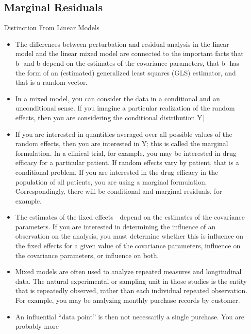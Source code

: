 \documentclass[Main.tex]{subfiles}
\begin{document}

\subsection*{Marginal Residuals}


Distinction From Linear Models
\begin{itemize}
	\item The differences between perturbation and residual analysis in the linear model and the linear mixed model
	are connected to the important facts that b and b
	depend on the estimates of the covariance parameters,
	that b has the form of an (estimated) generalized least squares (GLS) estimator, and that 
	is a random
	vector.
	\item In a mixed model, you can consider the data in a conditional and an unconditional sense. If you imagine
	a particular realization of the random effects, then you are considering the conditional distribution
	Y|
	\item If you are interested in quantities averaged over all possible values of the random effects, then
	you are interested in Y; this is called the marginal formulation. In a clinical trial, for example, you
	may be interested in drug efficacy for a particular patient. If random effects vary by patient, that is a
	conditional problem. If you are interested in the drug efficacy in the population of all patients, you are
	using a marginal formulation. Correspondingly, there will be conditional and marginal residuals, for
	example.
	\item The estimates of the fixed effects  depend on the estimates of the covariance parameters. If you are
	interested in determining the influence of an observation on the analysis, you must determine whether
	this is influence on the fixed effects for a given value of the covariance parameters, influence on the
	covariance parameters, or influence on both.
	\item Mixed models are often used to analyze repeated measures and longitudinal data. The natural experimental
	or sampling unit in those studies is the entity that is repeatedly observed, rather than each
	individual repeated observation. For example, you may be analyzing monthly purchase records by
	customer. 
	\item An influential “data point” is then not necessarily a single purchase. You are probably more

\end{itemize}
\end{document}
